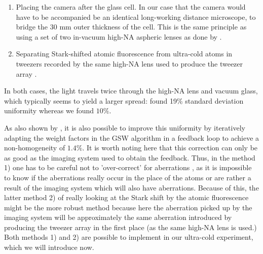 \begin{enumerate}
    \item Placing the camera after the glass cell. 
    In our case that the camera would have to be accompanied be an identical long-working distance microscope, to bridge the 30 mm outer thickness of the cell.
    This is the same principle as using a set of two in-vacuum high-NA aspheric lenses as done by \cite{Nogrette2014}.
    
    \item Separating Stark-shifted atomic fluorescence from ultra-cold atoms in tweezers recorded by the same high-NA lens used to produce the tweezer array \cite{Ebadi2021}.
\end{enumerate}
In both cases, the light travels twice through the high-NA lens and vacuum glass, which typically seems to yield a larger spread: \cite{Nogrette2014} found 19\% standard deviation uniformity whereas we found $10\%$.

As also shown by \cite{Nogrette2014}, it is also possible to improve this uniformity by iteratively adapting the weight factors in the \ac{GSW} algorithm in a feedback loop to achieve a non-homogeneity of $1.4\%$.
It is worth noting here that this correction can only be as good as the imaging system used to obtain the feedback. 
Thus, in the method 1) one has to be careful not to 'over-correct' for aberrations \cite{Labuhn2016}, as it is impossible to know if the aberrations really occur in the place of the atoms or are rather a result of the imaging system which will also have aberrations. 
Because of this, the latter method 2) of really looking at the Stark shift by the atomic fluorescence might be the more robust method because here the aberration picked up by the imaging system will be approximately the same aberration introduced by producing the tweezer array in the first place (as the same high-NA lens is used.)
Both methods 1) and 2) are possible to implement in our ultra-cold experiment, which we will introduce now.








